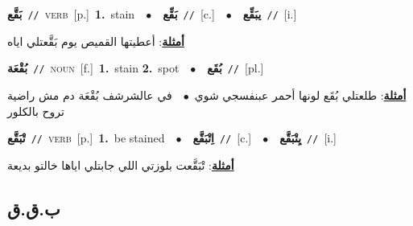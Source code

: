 \documentclass[10pt,a4paper,twoside]{article} %
\begin{document}
\begin{multicols}{2}
{\setlength\topsep{0pt}\textbf{\foreignlanguage{arabic}{بَقَّع}}\ {\color{gray}\texttt{//}\color{black}}\ \textsc{verb}\ [p.]\ \textbf{1.}~stain\ \ $\bullet$\ \ \setlength\topsep{0pt}\textbf{\foreignlanguage{arabic}{بَقِّع}}\ {\color{gray}\texttt{//}\color{black}}\ [c.]\ \ $\bullet$\ \ \setlength\topsep{0pt}\textbf{\foreignlanguage{arabic}{يبَقِّع}}\ {\color{gray}\texttt{//}\color{black}}\ [i.]\  \begin{flushright}\color{gray}\foreignlanguage{arabic}{\textbf{\underline{\foreignlanguage{arabic}{أمثلة}}}: أعطيتها القميص يوم بَقَّعتلي اياه}\end{flushright}\color{black}} \vspace{2mm}

{\setlength\topsep{0pt}\textbf{\foreignlanguage{arabic}{بُقْعَة}}\ {\color{gray}\texttt{//}\color{black}}\ \textsc{noun}\ [f.]\ \textbf{1.}~stain  \textbf{2.}~spot\ \ $\bullet$\ \ \setlength\topsep{0pt}\textbf{\foreignlanguage{arabic}{بُقَع}}\ {\color{gray}\texttt{//}\color{black}}\ [pl.]\  \begin{flushright}\color{gray}\foreignlanguage{arabic}{\textbf{\underline{\foreignlanguage{arabic}{أمثلة}}}: طلعتلي بُقَع لونها أحمر عبنفسجي شوي\ $\bullet$\ \  في عالشرشف بُقْعَة دم مش راضية تروح بالكلور}\end{flushright}\color{black}} \vspace{2mm}

{\setlength\topsep{0pt}\textbf{\foreignlanguage{arabic}{تْبَقَّع}}\ {\color{gray}\texttt{//}\color{black}}\ \textsc{verb}\ [p.]\ \textbf{1.}~be stained\ \ $\bullet$\ \ \setlength\topsep{0pt}\textbf{\foreignlanguage{arabic}{اِتْبَقَّع}}\ {\color{gray}\texttt{//}\color{black}}\ [c.]\ \ $\bullet$\ \ \setlength\topsep{0pt}\textbf{\foreignlanguage{arabic}{يِتْبَقَّع}}\ {\color{gray}\texttt{//}\color{black}}\ [i.]\  \begin{flushright}\color{gray}\foreignlanguage{arabic}{\textbf{\underline{\foreignlanguage{arabic}{أمثلة}}}: تْبَقَّعت بلوزتي اللي جابتلي اياها خالتو بديعة}\end{flushright}\color{black}} \vspace{2mm}

\vspace{-3mm}
\subsection*{\color{blue}\foreignlanguage{arabic}{ب.ق.ق}\color{blue}{}} 


\end{multicols}
\end{document}
